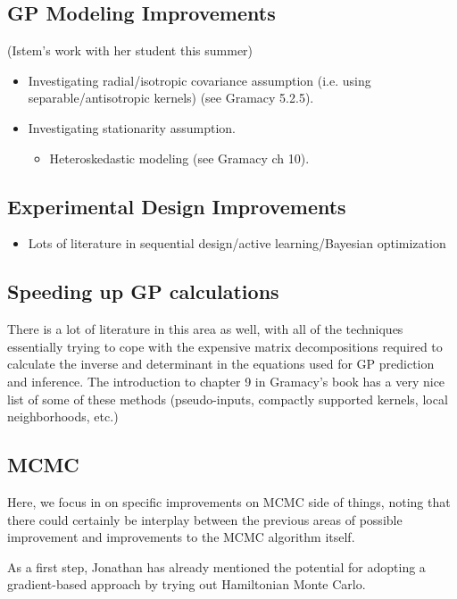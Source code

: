 \documentclass[12pt]{article}
\begin{document}
\subsection{GP Modeling Improvements} (Istem's work with her student this summer)
\begin{itemize}
\item Investigating radial/isotropic covariance assumption (i.e. using separable/antisotropic kernels) (see Gramacy 5.2.5).
\item Investigating stationarity assumption. 
	\begin{itemize}
	\item Heteroskedastic modeling (see Gramacy ch 10). 
	\end{itemize}
\end{itemize}

\subsection{Experimental Design Improvements}
\begin{itemize}
\item Lots of literature in sequential design/active learning/Bayesian optimization
\end{itemize}

\subsection{Speeding up GP calculations}
There is a lot of literature in this area as well, with all of the techniques essentially trying to cope with the expensive matrix decompositions required 
to calculate the inverse and determinant in the equations used for GP prediction and inference. The introduction to chapter 9 in Gramacy's book has a 
very nice list of some of these methods (pseudo-inputs, compactly supported kernels, local neighborhoods, etc.) 

\subsection{MCMC}
Here, we focus in on specific improvements on MCMC side of things, noting that there could certainly be interplay between the previous areas of possible improvement 
and improvements to the MCMC algorithm itself. 

As a first step, Jonathan has already mentioned the potential for adopting a gradient-based approach by trying out Hamiltonian Monte Carlo. 
\end{document}
